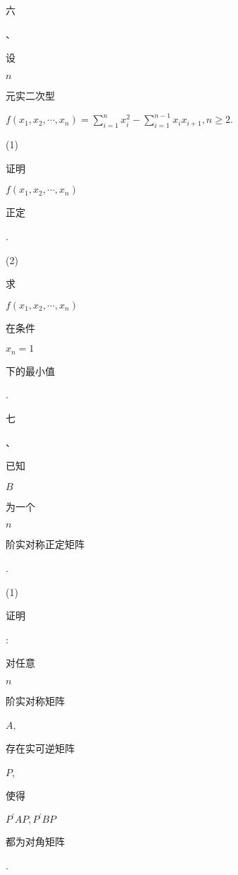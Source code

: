 \documentclass[10pt]{article}
\begin{document}
\begin{CJK}{UTF8}{mj}六\end{CJK}、\begin{CJK}{UTF8}{mj}设\end{CJK} $n$ \begin{CJK}{UTF8}{mj}元实二次型\end{CJK} $f\left(x_{1}, x_{2}, \cdots, x_{n}\right)=\sum_{i=1}^{n} x_{i}^{2}-\sum_{i=1}^{n-1} x_{i} x_{i+1}, n \geq 2$.

(1) \begin{CJK}{UTF8}{mj}证明\end{CJK} $f\left(x_{1}, x_{2}, \cdots, x_{n}\right)$ \begin{CJK}{UTF8}{mj}正定\end{CJK}.

(2) \begin{CJK}{UTF8}{mj}求\end{CJK} $f\left(x_{1}, x_{2}, \cdots, x_{n}\right)$ \begin{CJK}{UTF8}{mj}在条件\end{CJK} $x_{n}=1$ \begin{CJK}{UTF8}{mj}下的最小值\end{CJK}.

\begin{CJK}{UTF8}{mj}七\end{CJK}、\begin{CJK}{UTF8}{mj}已知\end{CJK} $B$ \begin{CJK}{UTF8}{mj}为一个\end{CJK} $n$ \begin{CJK}{UTF8}{mj}阶实对称正定矩阵\end{CJK}.

(1) \begin{CJK}{UTF8}{mj}证明\end{CJK}: \begin{CJK}{UTF8}{mj}对任意\end{CJK} $n$ \begin{CJK}{UTF8}{mj}阶实对称矩阵\end{CJK} $A$, \begin{CJK}{UTF8}{mj}存在实可逆矩阵\end{CJK} $P$, \begin{CJK}{UTF8}{mj}使得\end{CJK} $P^{\prime} A P, P^{\prime} B P$ \begin{CJK}{UTF8}{mj}都为对角矩阵\end{CJK}.
\end{document}
